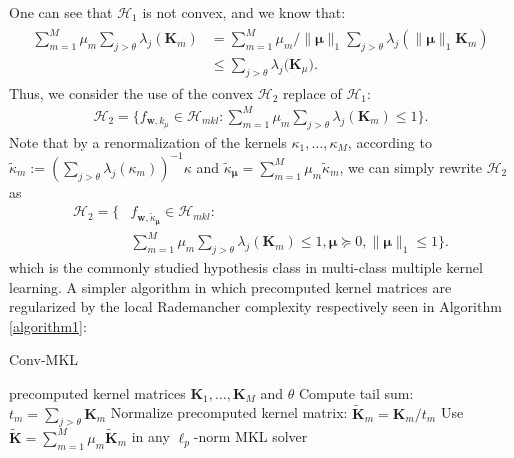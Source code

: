 \documentclass{article}
\begin{document}
One can see that $\mathcal{H}_{1}$ is not convex, and we know that:
\begin{align*}
    \begin{aligned}
        \sum_{m=1}^M\mu_m\sum_{j>\theta}\lambda_{j}(\mathbf{K}_m)
        & =\sum_{m=1}^M\mu_m/\|\mathbf{\mu}\|_1 \sum_{j>\theta}\lambda_{j}(\|\mathbf{\mu}\|_1\mathbf{K}_m)\\
        & \leq \sum_{j>\theta} \lambda_j\big(\mathbf{K}_\mu\big).
    \end{aligned}
\end{align*}
Thus, we consider the use of the convex $\mathcal{H}_2$ replace of $\mathcal{H}_1$:
\begin{align}
    \mathcal{H}_{2}=\Big\{f_{\mathbf{w}, k_\mu} \in \mathcal{H}_{mkl}:
    \sum_{m=1}^M\mu_m\sum_{j>\theta}\lambda_{j}(\mathbf{K}_m) \leq 1\Big\}.
\end{align}
Note that by a renormalization of the kernels $\kappa_1,\ldots,\kappa_M$,
according to $\tilde{\kappa}_m:=\left(\sum_{j>\theta}\lambda_j(\kappa_m)\right)^{-1}\kappa$
and $\tilde{\kappa}_{\bm \mu}=\sum_{m=1}^M\mu_m\tilde{\kappa}_m$,
we can simply rewrite $\mathcal{H}_2$ as
\begin{align*}
  \mathcal{H}_{2}=\Big\{&f_{\mathbf{w},\tilde{\kappa}_{\bm \mu}} \in \mathcal{H}_{mkl}:\\
    &\sum_{m=1}^M\mu_m\sum_{j>\theta}\lambda_{j}(\mathbf{K}_m) \leq 1,\bm \mu\succeq 0,\|\bm \mu\|_1 \leq 1\Big\}.
\end{align*}
which is the commonly studied hypothesis class in multi-class multiple kernel learning.
A simpler algorithm in which precomputed kernel matrices
are regularized by the local Rademancher complexity respectively seen in Algorithm  \ref{algorithm1}:
\begin{algorithm}[h]
   \caption{Conv-MKL}
   \label{algorithm1}
    \begin{algorithmic}
        precomputed kernel matrices $\mathbf{K}_1,\ldots,\mathbf{K}_M$ and $\theta$
        \STATE Compute tail sum: $t_m=\sum_{j>\theta}\mathbf{K}_m$
        \STATE Normalize precomputed kernel matrix: $\widetilde{\mathbf{K}}_m=\mathbf{K}_m/t_m$
       \ENDFOR
       \STATE Use $\widetilde{\mathbf{K}}=\sum_{m=1}^M \mu_m \widetilde{\mathbf{K}}_m$ in any $\ell_p$-norm MKL solver
    \end{algorithmic}
\end{algorithm}
\end{document}
